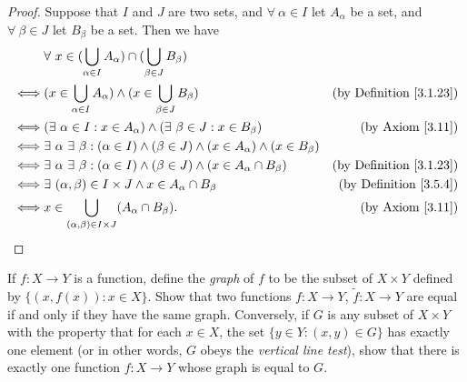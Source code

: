 \begin{proof}
    Suppose that \(I\) and \(J\) are two sets, and \(\forall\ \alpha \in I\) let \(A_{\alpha}\) be a set, and \(\forall\ \beta \in J\) let \(B_{\beta}\) be a set.
    Then we have
    \begin{align*}
             & \forall\ x \in (\bigcup_{\alpha \in I} A_{\alpha}) \cap (\bigcup_{\beta \in J} B_{\beta})                                                                    \\
        \iff & (x \in \bigcup_{\alpha \in I} A_{\alpha}) \land (x \in \bigcup_{\beta \in J} B_{\beta})                                & \text{(by Definition \ref{3.1.23})} \\
        \iff & (\exists\ \alpha \in I : x \in A_{\alpha}) \land (\exists\ \beta \in J : x \in B_{\beta})                              & \text{(by Axiom \ref{3.11})}        \\
        \iff & \exists\ \alpha \ \exists\ \beta : (\alpha \in I) \land (\beta \in J) \land (x \in A_{\alpha}) \land (x \in B_{\beta})                                       \\
        \iff & \exists\ \alpha \ \exists\ \beta : (\alpha \in I) \land (\beta \in J) \land (x \in A_{\alpha} \cap B_{\beta})          & \text{(by Definition \ref{3.1.23})} \\
        \iff & \exists\ (\alpha, \beta) \in I \times J \land x \in A_{\alpha} \cap B_{\beta}                                          & \text{(by Definition \ref{3.5.4})}  \\
        \iff & x \in \bigcup_{(\alpha, \beta) \in I \times J} (A_{\alpha} \cap B_{\beta}).                                            & \text{(by Axiom \ref{3.11})}
    \end{align*}
\end{proof}

\begin{exercise}\label{ex 3.5.10}
    If \(f : X \to Y\) is a function, define the \emph{graph} of \(f\) to be the subset of \(X \times Y\) defined by \(\{(x, f(x)) : x \in X\}\).
    Show that two functions \(f : X \to Y\), \(\tilde{f} : X \to Y\) are equal if and only if they have the same graph.
    Conversely, if \(G\) is any subset of \(X \times Y\) with the property that for each \(x \in X\), the set \(\{y \in Y : (x, y) \in G\}\) has exactly one element (or in other words, \(G\) obeys the \emph{vertical line test}), show that there is exactly one function \(f : X \to Y\) whose graph is equal to \(G\).
\end{exercise}

